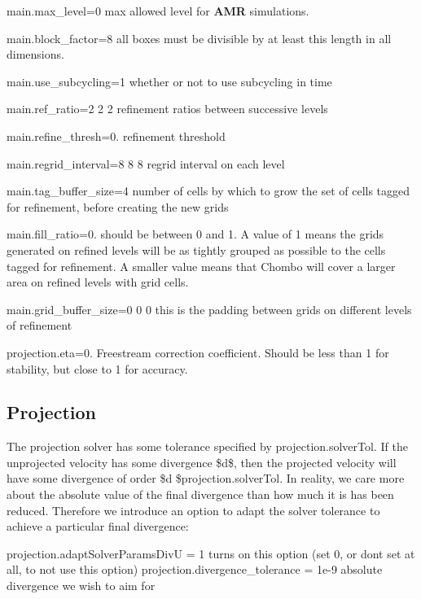 {\ttfamily main.\+max\+\_\+level=0} max allowed level for \textbf{ A\+MR} simulations.

{\ttfamily main.\+block\+\_\+factor=8} all boxes must be divisible by at least this length in all dimensions.

{\ttfamily main.\+use\+\_\+subcycling=1} whether or not to use subcycling in time

{\ttfamily main.\+ref\+\_\+ratio=2 2 2} refinement ratios between successive levels

{\ttfamily main.\+refine\+\_\+thresh=0.} refinement threshold

{\ttfamily main.\+regrid\+\_\+interval=8 8 8} regrid interval on each level

{\ttfamily main.\+tag\+\_\+buffer\+\_\+size=4} number of cells by which to grow the set of cells tagged for refinement, before creating the new grids

{\ttfamily main.\+fill\+\_\+ratio=0.} should be between 0 and 1. A value of 1 means the grids generated on refined levels will be as tightly grouped as possible to the cells tagged for refinement. A smaller value means that Chombo will cover a larger area on refined levels with grid cells.

{\ttfamily main.\+grid\+\_\+buffer\+\_\+size=0 0 0} this is the \textquotesingle{}padding\textquotesingle{} between grids on different levels of refinement

{\ttfamily projection.\+eta=0.} Freestream correction coefficient. Should be less than 1 for stability, but close to 1 for accuracy.

\subsection*{Projection}

The projection solver has some tolerance specified by {\ttfamily projection.\+solver\+Tol}. If the unprojected velocity has some divergence \$d\$, then the projected velocity will have some divergence of order \$d  \${\ttfamily projection.\+solver\+Tol}. In reality, we care more about the absolute value of the final divergence than how much it is has been reduced. Therefore we introduce an option to adapt the solver tolerance to achieve a particular final divergence\+:

{\ttfamily projection.\+adapt\+Solver\+Params\+DivU = 1} turns on this option (set 0, or don\textquotesingle{}t set at all, to not use this option) {\ttfamily projection.\+divergence\+\_\+tolerance = 1e-\/9} absolute divergence we wish to aim for

